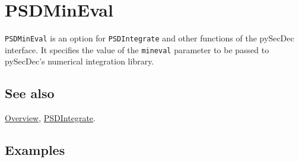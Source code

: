 \documentclass[../FeynHelpersManual.tex]{subfiles}
\begin{document}
\hypertarget{psdmineval}{
\section{PSDMinEval}\label{psdmineval}}

\texttt{PSDMinEval} is an option for \texttt{PSDIntegrate} and other
functions of the pySecDec interface. It specifies the value of the
\texttt{mineval} parameter to be passed to pySecDec's numerical
integration library.

\subsection{See also}

\hyperlink{toc}{Overview}, \hyperlink{psdintegrate}{PSDIntegrate}.

\subsection{Examples}
\end{document}
